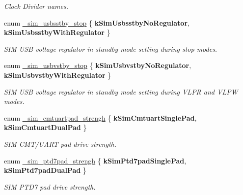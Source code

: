 \begin{DoxyCompactItemize}
\begin{DoxyCompactList}\small\item\em Clock Divider names. \end{DoxyCompactList}
\item 
enum \hyperlink{group__sim__hal_gae03f4921f897f628aacaae2aa34a9519}{\+\_\+sim\+\_\+usbsstby\+\_\+stop} \{ {\bfseries k\+Sim\+Usbsstby\+No\+Regulator}, 
{\bfseries k\+Sim\+Usbsstby\+With\+Regulator}
 \}\hypertarget{group__sim__hal_gae03f4921f897f628aacaae2aa34a9519}{}\label{group__sim__hal_gae03f4921f897f628aacaae2aa34a9519}
\begin{DoxyCompactList}\small\item\em S\+IM U\+SB voltage regulator in standby mode setting during stop modes. \end{DoxyCompactList}
\item 
enum \hyperlink{group__sim__hal_ga7fafd70d9012b3c106f260e4e169fbfe}{\+\_\+sim\+\_\+usbvstby\+\_\+stop} \{ {\bfseries k\+Sim\+Usbvstby\+No\+Regulator}, 
{\bfseries k\+Sim\+Usbvstby\+With\+Regulator}
 \}\hypertarget{group__sim__hal_ga7fafd70d9012b3c106f260e4e169fbfe}{}\label{group__sim__hal_ga7fafd70d9012b3c106f260e4e169fbfe}
\begin{DoxyCompactList}\small\item\em S\+IM U\+SB voltage regulator in standby mode setting during V\+L\+PR and V\+L\+PW modes. \end{DoxyCompactList}
\item 
enum \hyperlink{group__sim__hal_ga14707db7ac1696ba5f3b08dafd1f9b53}{\+\_\+sim\+\_\+cmtuartpad\+\_\+strengh} \{ {\bfseries k\+Sim\+Cmtuart\+Single\+Pad}, 
{\bfseries k\+Sim\+Cmtuart\+Dual\+Pad}
 \}\hypertarget{group__sim__hal_ga14707db7ac1696ba5f3b08dafd1f9b53}{}\label{group__sim__hal_ga14707db7ac1696ba5f3b08dafd1f9b53}
\begin{DoxyCompactList}\small\item\em S\+IM C\+M\+T/\+U\+A\+RT pad drive strength. \end{DoxyCompactList}
\item 
enum \hyperlink{group__sim__hal_gaaef010423e66cdbe22eb1e01a1feec4b}{\+\_\+sim\+\_\+ptd7pad\+\_\+strengh} \{ {\bfseries k\+Sim\+Ptd7pad\+Single\+Pad}, 
{\bfseries k\+Sim\+Ptd7pad\+Dual\+Pad}
 \}\hypertarget{group__sim__hal_gaaef010423e66cdbe22eb1e01a1feec4b}{}\label{group__sim__hal_gaaef010423e66cdbe22eb1e01a1feec4b}
\begin{DoxyCompactList}\small\item\em S\+IM P\+T\+D7 pad drive strength. \end{DoxyCompactList}

\end{DoxyCompactItemize}
